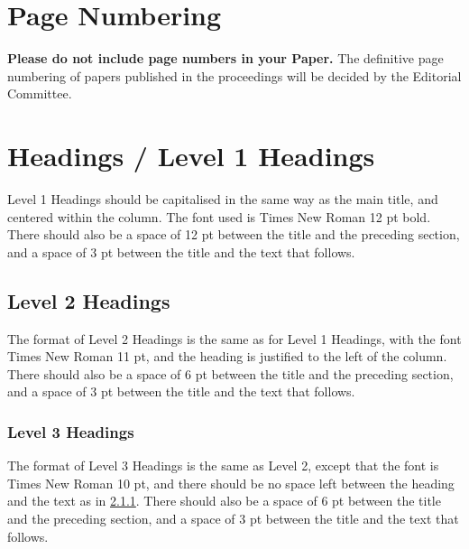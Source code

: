 \documentclass[10pt, a4paper]{article}
\begin{document}
\section{Page Numbering}

\textbf{Please do not include page numbers in your Paper.} The definitive page numbering of papers published in the proceedings will be decided by the Editorial Committee.

\section{Headings / Level 1 Headings} 

Level 1 Headings should be capitalised in the same way as the main title, and centered within the column. The font used is Times New Roman 12 pt bold. There should also be a space of 12 pt between the title and the preceding section, and a space of 3 pt between the title and the text that follows.

\subsection{Level 2 Headings}

The format of Level 2 Headings is the same as for Level 1 Headings, with the font Times New Roman 11 pt, and the heading is justified to the left of the column. There should also be a space of 6 pt between the title and the preceding section, and a space of 3 pt between the title and the text that follows.

\subsubsection{Level 3 Headings}
\label{level3H}
The format of Level 3 Headings is the same as Level 2, except that the font is Times New Roman 10 pt, and there should be no space left between the heading and the text as in \ref{level3H}. There should also be a space of 6 pt between the title and the preceding section, and a space of 3 pt between the title and the text  that follows.

%
\end{document}
